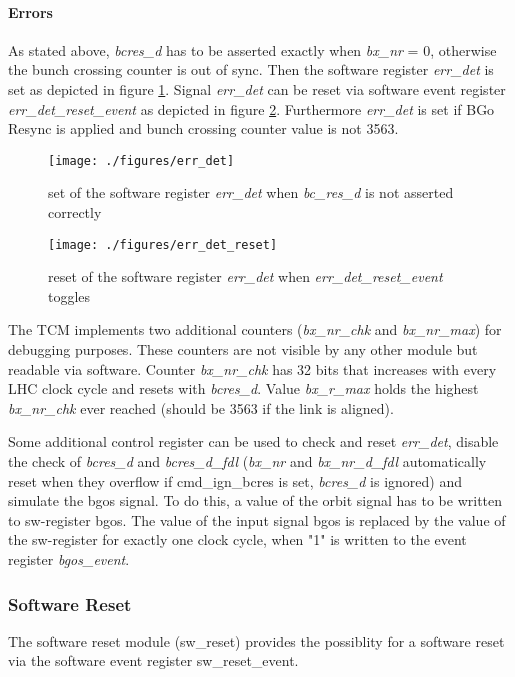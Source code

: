 \paragraph{Errors}\label{subsec:framework:tcmerrors}
As stated above, \textit{bcres\_d} has to be asserted exactly when \textit{bx\_nr} = 0, otherwise the bunch crossing counter is out of sync. Then the software register \textit{err\_det} is set as depicted in figure \ref{fig:err_det}. Signal \textit{err\_det} can be reset via software event register \textit{err\_det\_reset\_event} as depicted in figure \ref{fig:err_det_reset}. Furthermore \textit{err\_det} is set if BGo Resync is applied and bunch crossing counter value is not 3563.

\begin{figure}[ht]
  \texttt{[image: ./figures/err\_det]}
  \caption{set of the software register \textit{err\_det} when \textit{bc\_res\_d} is not asserted correctly}
  \label{fig:err_det}
\end{figure}

\begin{figure}[ht]
  \texttt{[image: ./figures/err\_det\_reset]}
  \caption{reset of the software register \textit{err\_det} when \textit{err\_det\_reset\_event} toggles}
  \label{fig:err_det_reset}
\end{figure}

The TCM implements two additional counters (\textit{bx\_nr\_chk} and \textit{bx\_nr\_max}) for debugging purposes. These counters are not visible by any other module but readable via software. Counter \textit{bx\_nr\_chk} has 32 bits that increases with every LHC clock cycle and resets with \textit{bcres\_d}. Value \textit{bx\_r\_max} holds the highest \textit{bx\_nr\_chk} ever reached (should be 3563 if the link is aligned).

Some additional control register can be used to check and reset \textit{err\_det}, disable the check of \textit{bcres\_d} and \textit{bcres\_d\_fdl} (\textit{bx\_nr} and \textit{bx\_nr\_d\_fdl} automatically reset when they overflow if cmd\_ign\_bcres is set, \textit{bcres\_d} is ignored) and simulate the bgos signal. To do this, a value of the orbit signal has to be written to sw-register bgos. The value of the input signal bgos is replaced by the value of the sw-register for exactly one clock cycle, when "1" is written to the event register \textit{bgos\_event}.

\subsubsection{Software Reset} \label{sec:framework:software_reset}
The software reset module (sw\_reset) provides the possiblity for a software reset via the software event register sw\_reset\_event.


